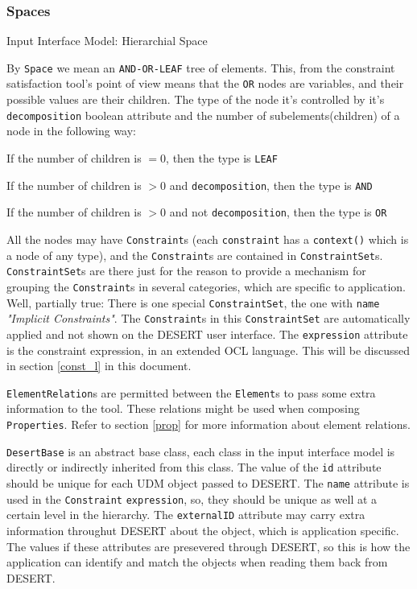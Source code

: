 \documentclass{article}
\begin{document}
\subsubsection{{\bf Spaces}}
\label{space}
\vspace{1cm}
\begin{center}
{\par Input Interface Model: Hierarchial Space}
\end{center}
\vspace{1cm}

{\par By {\tt Space} we mean an {\tt AND-OR-LEAF} tree of elements. This, from the constraint satisfaction tool's point of view means that the {\tt OR} nodes are variables, and their possible values are their children. The type of the node it's controlled by it's {\tt decomposition} boolean attribute and the number of subelements(children) of a node in the following way:}
\begin{list}{}{}
\item{ If the number of children is $= 0$, then the type is {\tt LEAF}}
\item{ If the number of children is $> 0$ and {\tt decomposition}, then the type is {\tt AND}}
\item{ If the number of children is $> 0$ and not {\tt decomposition}, then the type is {\tt OR}}
\end{list}
{\par
  All the nodes may have {\tt Constraint}s (each {\tt constraint} has a {\tt context()} which is a node of any type), and the {\tt Constraint}s are contained in {\tt ConstraintSet}s. {\tt ConstraintSet}s are there just for the reason to provide a mechanism for grouping the {\tt Constraint}s in several categories, which are specific to application. Well, partially true: There is one special {\tt ConstraintSet}, the one with {\tt name} {\it "Implicit Constraints"}. The {\tt Constraint}s in this {\tt ConstraintSet} are automatically applied and not shown on the  DESERT user interface. The {\tt expression} attribute is the constraint expression, in an extended OCL language. This will be discussed in section \ref{const_l} in this document.}
{\par
{\tt ElementRelation}s are permitted between the {\tt Element}s to pass some extra information to the tool. These relations might be used when composing {\tt Properties}. Refer to section \ref{prop} for more information about element relations.
}
{\par {\tt DesertBase} is an abstract base class, each class in the input interface model is directly or indirectly inherited from this class. The value of the {\tt id} attribute should be unique for each UDM\cite{UDM} object passed to DESERT. The {\tt name} attribute is used in the {\tt Constraint} {\tt expression}, so, they should be unique as well at a certain level in the hierarchy. The {\tt externalID} attribute may carry extra information throughut DESERT about the object, which is application specific. The values if these attributes are presevered through DESERT, so this is how the application can identify and match the objects when reading them back from DESERT. 
}
\end{document}
